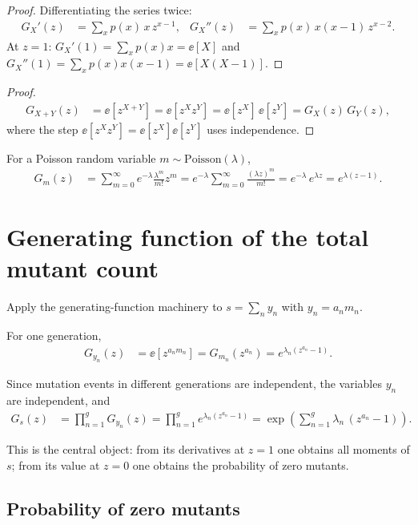 \begin{proof}
Differentiating the series twice:
\begin{align}
G_X'(z) &= \sum_{x} p(x)\,x\,z^{x-1},
&
G_X''(z) &= \sum_{x} p(x)\,x(x-1)\,z^{x-2}.
\end{align}
At $z=1$: $G_X'(1)=\sum_x p(x)x=\ee[X]$ and $G_X''(1)=\sum_x p(x)x(x-1)=\ee[X(X-1)]$.
\end{proof}

\begin{proof}
\begin{align}
G_{X+Y}(z)
&= \ee[z^{X+Y}]
= \ee[z^{X}z^{Y}]
= \ee[z^{X}]\,\ee[z^{Y}]
= G_X(z)\,G_Y(z),
\end{align}
where the step $\ee[z^Xz^Y]=\ee[z^X]\ee[z^Y]$ uses independence.
\end{proof}

For a Poisson random variable $m\sim\mathrm{Poisson}(\lambda)$,
\begin{align}\label{eq:lecture03-poisson-pgf}
G_m(z)
&= \sum_{m=0}^{\infty} e^{-\lambda}\frac{\lambda^{m}}{m!}z^{m}
= e^{-\lambda}\sum_{m=0}^{\infty}\frac{(\lambda z)^{m}}{m!}
= e^{-\lambda}\,e^{\lambda z}
= e^{\lambda(z-1)} .
\end{align}

\section{Generating function of the total mutant count}\label{sec:lecture03-gs}

Apply the generating-function machinery to $s=\sum_n y_n$ with $y_n = a_n m_n$.

For one generation,
\begin{align}\label{eq:lecture03-yn-pgf}
G_{y_n}(z)
&= \ee[z^{a_n m_n}]
= G_{m_n}(z^{a_n})
= e^{\lambda_n(z^{a_n}-1)} .
\end{align}

Since mutation events in different generations are independent, the variables $y_n$ are independent, and
\begin{align}\label{eq:lecture03-gs-def}
G_s(z)
&= \prod_{n=1}^{g} G_{y_n}(z)
= \prod_{n=1}^{g} e^{\lambda_n(z^{a_n}-1)}
= \exp\!\left(\sum_{n=1}^{g}\lambda_n\,(z^{a_n}-1)\right) .
\end{align}

This is the central object: from its derivatives at $z=1$ one obtains all moments of $s$; from its value at $z=0$ one obtains the probability of zero mutants.

\subsection{Probability of zero mutants}\label{subsec:lecture03-zero-mutants}

